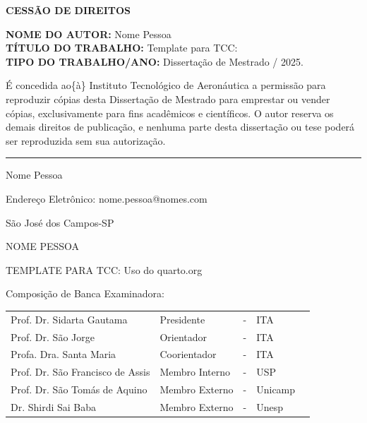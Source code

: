 \documentclass[
  12pt,
  oneside,
  a4paper,
  english,
  brazil]{abntex2}
\begin{document}
\vfill

\textbf{CESSÃO DE DIREITOS}

\textbf{NOME DO AUTOR:} Nome Pessoa\\
\textbf{TÍTULO DO TRABALHO:} Template para TCC:\\
\textbf{TIPO DO TRABALHO/ANO:} Dissertação de Mestrado / 2025.

É concedida ao\{à\} Instituto Tecnológico de Aeronáutica a permissão
para reproduzir cópias desta Dissertação de Mestrado para emprestar ou
vender cópias, exclusivamente para fins acadêmicos e científicos. O
autor reserva os demais direitos de publicação, e nenhuma parte desta
dissertação ou tese poderá ser reproduzida sem sua autorização.

\vspace{1cm}

\begin{center}\rule{0.5\linewidth}{0.5pt}\end{center}

Nome Pessoa

Endereço Eletrônico: nome.pessoa@nomes.com

São José dos Campos-SP

\newpage{}

\begin{center}

\uppercase{ Nome Pessoa }

\vfill

\begin{center}
  \uppercase{ Template para TCC: }
  Uso do quarto.org
\end{center}

\end{center}

\vfill

Composição de Banca Examinadora:

\begin{center}

\begin{tabular}{>{\raggedright\arraybackslash}p{6cm} >{\raggedright\arraybackslash}p{4cm} >{\raggedright\arraybackslash}p{3cm} >{\raggedright\arraybackslash}p{1cm} >{\raggedright\arraybackslash}p{3cm}}
 Prof. Dr. Sidarta Gautama    & Presidente     & - & ITA \\
 Prof. Dr. São Jorge    & Orientador     & - & ITA \\
 Profa. Dra. Santa Maria  & Coorientador   & - & ITA \\
 Prof. Dr. São Francisco de Assis       & Membro Interno & - & USP \\
 Prof. Dr. São Tomás de Aquino     & Membro Externo & - & Unicamp \\
 Dr. Shirdi Sai Baba     & Membro Externo & - & Unesp \\
\end{tabular}

\end{center}
\end{document}
